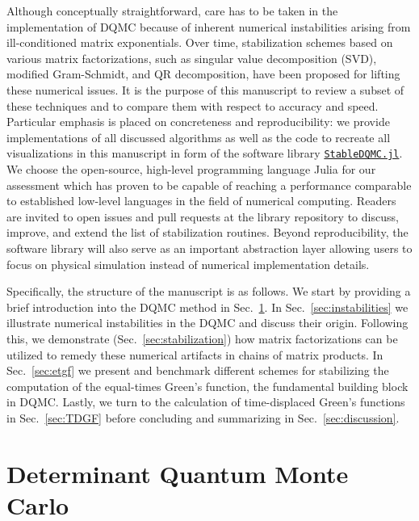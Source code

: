 \documentclass[submission, Phys]{SciPost}
\begin{document}
Although conceptually straightforward, care has to be taken in the implementation of DQMC because of inherent numerical instabilities arising from ill-conditioned matrix exponentials. Over time, stabilization schemes \cite{Loh1989, Loh2005, Bai2011, Sorella1989, Assaad2002a} based on various matrix factorizations, such as singular value decomposition (SVD), modified Gram-Schmidt, and QR decomposition, have been proposed for lifting these numerical issues. It is the purpose of this manuscript to review a subset of these techniques and to compare them with respect to accuracy and speed. Particular emphasis is placed on concreteness and reproducibility: we provide implementations of all discussed algorithms as well as the code to recreate all visualizations in this manuscript in form of the software library \href{http://github.com/crstnbr/StableDQMC.jl}{\texttt{StableDQMC.jl}}. We choose the open-source, high-level programming language Julia\cite{Bezanson2017, JuliaNature2019} for our assessment which has proven \cite{diffeqbench, Luo2019} to be capable of reaching a performance comparable to established low-level languages in the field of numerical computing. Readers are invited to open issues and pull requests at the library repository to discuss, improve, and extend the list of stabilization routines. Beyond reproducibility, the software library will also serve as an important abstraction layer allowing users to focus on physical simulation instead of numerical implementation details.

Specifically, the structure of the manuscript is as follows. We start by providing a brief introduction into the DQMC method in Sec.~\ref{sec:QMC}. In Sec.~\ref{sec:instabilities} we illustrate numerical instabilities in the DQMC and discuss their origin. Following this, we demonstrate (Sec.~\ref{sec:stabilization}) how matrix factorizations can be utilized to remedy these numerical artifacts in chains of matrix products. In Sec.~\ref{sec:etgf} we present and benchmark different schemes for stabilizing the computation of the equal-times Green's function, the fundamental building block in DQMC. Lastly, we turn to the calculation of time-displaced Green's functions in Sec.~\ref{sec:TDGF} before concluding and summarizing in Sec.~\ref{sec:discussion}.

\section{Determinant Quantum Monte Carlo}\label{sec:QMC}
\end{document}
